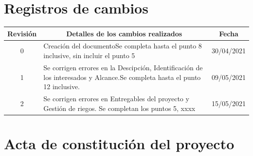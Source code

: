 \documentclass[
11pt, %
codirector, %
]{charter}
\begin{document}
\maketitle
\thispagestyle{empty}
\pagebreak


\thispagestyle{empty}
{\setlength{\parskip}{0pt}
\tableofcontents{}
}
\pagebreak


\section{Registros de cambios}
\label{sec:registro}


\begin{table}[ht]
\label{tab:registro}
\centering
\begin{tabularx}{\linewidth}{@{}|c|X|c|@{}}
\hline
\rowcolor[HTML]{C0C0C0} 
Revisión & \multicolumn{1}{c|}{\cellcolor[HTML]{C0C0C0}Detalles de los cambios realizados} & Fecha      \\ \hline
0      & Creación del documento\newline Se completa hasta el punto 8 inclusive, sin incluir el punto 5 &30/04/2021 \\ \hline
1      & Se corrigen errores en la Descipción, Identificación de los interesados y Alcance.\newline Se completa hasta el punto 12 inclusive.                  & 09/05/2021 \\ \hline
2      & Se corrigen errores en Entregables del proyecto y Gestión de riegos. \newline
Se completan los puntos 5, xxxx					& 15/05/2021 \\ \hline
\end{tabularx}
\end{table}

\pagebreak



\section{Acta de constitución del proyecto}
\label{sec:acta}
\end{document}
